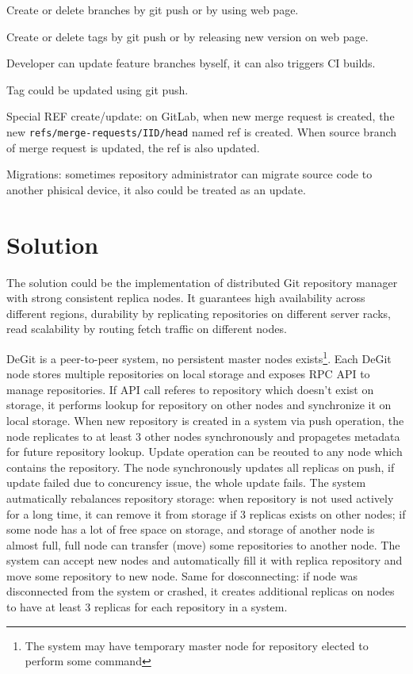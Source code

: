 \documentclass[12pt,oneside]{article}
\newcommand{\code}[1]{\texttt{#1}}
\begin{document}
\begin{description}
  \item Create or delete branches by git push or by using web page.
  \item Create or delete tags by git push or by releasing new version on web page.
  \item Developer can update feature branches byself, it can also triggers CI builds.
  \item Tag could be updated using git push.
  \item Special REF create/update: on GitLab, when new merge request is created,
    the new \code{refs/merge-requests/IID/head} named ref
    is created. When source branch of merge request is updated, the ref is also updated.
  \item Migrations: sometimes repository administrator can migrate source code to
    another phisical device, it also could be treated as an update.
\end{description}

\section{Solution}

The solution could be the implementation of distributed Git repository manager with
strong consistent replica nodes. It guarantees high availability across
different regions, durability by replicating repositories on different server racks,
read scalability by routing fetch traffic on different nodes.

DeGit is a peer-to-peer system, no persistent master nodes
exists\footnote{The system may have temporary master node for repository elected to perform some command}.
Each DeGit node stores multiple repositories on local storage
and exposes RPC API to manage repositories.
If API call referes to repository which doesn't exist on storage, it performs lookup
for repository on other nodes and synchronize it on local storage.
When new repository is created in a system via push operation, the node
replicates to at least 3 other nodes synchronously and propagetes metadata for future repository
lookup.
Update operation can be reouted to any node which contains the repository.
The node synchronously updates all replicas on push, if update failed due to concurency issue,
the whole update fails.
The system autmatically rebalances repository storage: when repository is not used actively for a
long time, it can remove it from storage if 3 replicas exists on other nodes; if some node
has a lot of free space on storage, and storage of another node is almost full,
full node can transfer (move) some repositories to another node.
The system can accept new nodes and automatically fill it with replica repository and
move some repository to new node. Same for dosconnecting: if node was disconnected from the system or crashed,
it creates additional replicas on nodes to have at least 3 replicas for each repository in a system.
\end{document}
